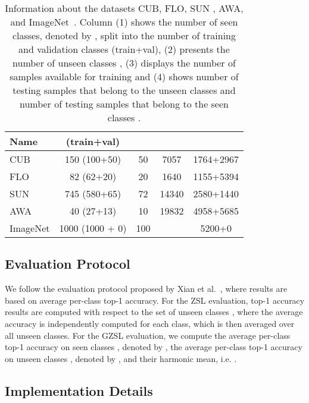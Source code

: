 \documentclass[runningheads]{llncs}
\begin{document}
\begin{table}[t]
\centering
\label{table:dataset-stats}
\caption{Information about the datasets CUB\cite{welinder2010caltech}, FLO\cite{nilsback2008automated}, SUN \cite{xiao2010sun}, AWA\cite{XianCVPR2017}, and ImageNet~\cite{deng2009imagenet}. Column (1) shows the number of seen classes, denoted by , split into the number of training and validation classes (train+val), (2) presents the number of unseen classes , (3) displays the number of samples available for training  and (4) shows number of testing samples that belong to the unseen classes  and number of testing samples that belong to the seen classes .}
\begin{tabular}{l|c|c|c|c}
\hline
\textbf{Name} &  (train+val) &  &  &  \\
\hline
CUB     & 150 (100+50) & 50 & 7057 & 1764+2967  \\
FLO     & 82 (62+20) & 20 & 1640 & 1155+5394  \\
SUN    & 745 (580+65) & 72 & 14340 & 2580+1440   \\
AWA    & 40 (27+13) & 10 & 19832 & 4958+5685   \\
ImageNet & 1000 (1000 + 0) & 100 &  & 5200+0    \\
\hline
\end{tabular}
\end{table}



\subsection{Evaluation Protocol}

We follow the evaluation protocol proposed by Xian et al.~\cite{XianCVPR2017}, where results are based on average per-class top-1 accuracy.  For the ZSL evaluation, top-1 accuracy results are computed with respect to the set of unseen classes , where the average accuracy is  independently computed for each class, which is then averaged over all unseen classes.  For the GZSL evaluation, we compute the average per-class top-1 accuracy on seen classes , denoted by , the average per-class top-1 accuracy on unseen classes , denoted by , and their harmonic mean, i.e. .

\subsection{Implementation Details}
\end{document}
